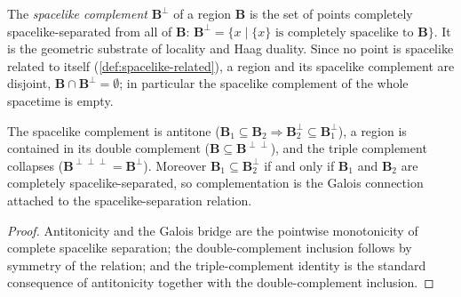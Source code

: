 \medskip

\begin{definition}
    \label{def:spacelike-complement}
    \leanok
    The \emph{spacelike complement} $\mathbf{B}^\perp$ of a region $\mathbf{B}$ is the set of points completely spacelike-separated from all of $\mathbf{B}$: $\mathbf{B}^\perp = \{ x \mid \{x\} \text{ is completely spacelike to } \mathbf{B} \}$. It is the geometric substrate of locality and Haag duality. Since no point is spacelike related to itself (\ref{def:spacelike-related}), a region and its spacelike complement are disjoint, $\mathbf{B} \cap \mathbf{B}^\perp = \emptyset$; in particular the spacelike complement of the whole spacetime is empty.
\end{definition}

\medskip

\begin{lemma}
    \label{lmm:spacelike-complement-order}
    \leanok
    The spacelike complement is antitone ($\mathbf{B}_1 \subseteq \mathbf{B}_2 \Rightarrow \mathbf{B}_2^\perp \subseteq \mathbf{B}_1^\perp$), a region is contained in its double complement ($\mathbf{B} \subseteq \mathbf{B}^{\perp\perp}$), and the triple complement collapses ($\mathbf{B}^{\perp\perp\perp} = \mathbf{B}^\perp$). Moreover $\mathbf{B}_1 \subseteq \mathbf{B}_2^\perp$ if and only if $\mathbf{B}_1$ and $\mathbf{B}_2$ are completely spacelike-separated, so complementation is the Galois connection attached to the spacelike-separation relation.
\end{lemma}
\begin{proof}
    \leanok
    Antitonicity and the Galois bridge are the pointwise monotonicity of complete spacelike separation; the double-complement inclusion follows by symmetry of the relation; and the triple-complement identity is the standard consequence of antitonicity together with the double-complement inclusion.
\end{proof}

